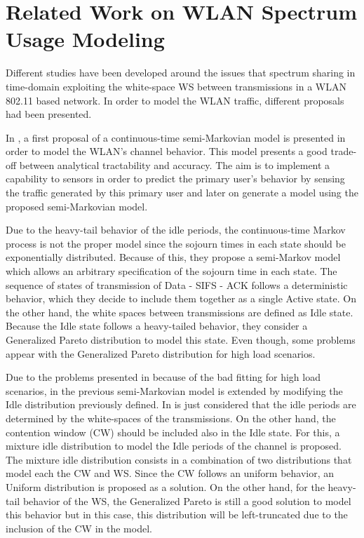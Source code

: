 \section{Related Work on WLAN Spectrum Usage Modeling} \label{sec:intro_related}
Different studies have been developed around the issues that spectrum sharing in time-domain exploiting the white-space \acs{WS} between transmissions in a \acs{WLAN} 802.11 based network. In order to model the \acs{WLAN} traffic, different proposals had been presented.

In \cite{ActiveMeasure}, a first proposal of a continuous-time semi-Markovian model is presented in order to model the \acs{WLAN}'s channel behavior. This model presents a good trade-off between analytical tractability and accuracy. The aim is to implement a capability to sensors in order to predict the primary user's behavior by sensing the traffic generated by this primary user and later on generate a model using the proposed semi-Markovian model.

Due to the heavy-tail behavior of the idle periods, the continuous-time Markov process is not the proper model since the sojourn times in each state should be exponentially distributed. Because of this, they propose a semi-Markov model which allows an arbitrary specification of the sojourn time in each state. The sequence of states of transmission of Data - SIFS - ACK follows a deterministic behavior, which they decide to include them together as a single Active state. On the other hand, the white spaces between transmissions are defined as Idle state. Because the Idle state follows a heavy-tailed behavior, they consider a Generalized Pareto distribution to model this state. Even though, some problems appear with the Generalized Pareto distribution for high load scenarios.

Due to the problems presented in \cite{ActiveMeasure} because of the bad fitting for high load scenarios, in \cite{DSA-Emp} the previous semi-Markovian model is extended by modifying the Idle distribution previously defined. In \cite{ActiveMeasure} is just considered that the idle periods are determined by the white-spaces of the transmissions. On the other hand, the contention window (\acs{CW}) should be included also in the Idle state. For this, a mixture idle distribution to model the Idle periods of the channel is proposed. The mixture idle distribution consists in a combination of two distributions that model each the \acs{CW} and \acs{WS}. Since the \acs{CW} follows an uniform behavior, an Uniform distribution is proposed as a solution. On the other hand, for the heavy-tail behavior of the \acs{WS}, the Generalized Pareto is still a good solution to model this behavior but in this case, this distribution will be left-truncated due to the inclusion of the \acs{CW} in the model.


